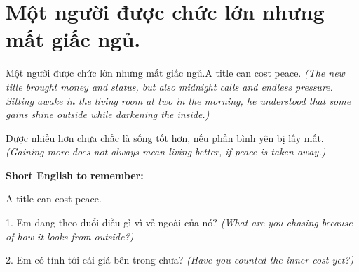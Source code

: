 \section{Một người được chức lớn nhưng mất giấc ngủ.}
\begin{truyen}{Một người được chức lớn nhưng mất giấc ngủ.}{A title can cost peace.}
\textit{(The new title brought money and status, but also midnight calls and endless pressure. Sitting awake in the living room at two in the morning, he understood that some gains shine outside while darkening the inside.)}
\end{truyen}
\begin{baihoc}
Được nhiều hơn chưa chắc là sống tốt hơn, nếu phần bình yên bị lấy mất.
\textit{(Gaining more does not always mean living better, if peace is taken away.)}
\end{baihoc}
\begin{ghinhoanh}\textbf{Short English to remember:}

A title can cost peace.
\end{ghinhoanh}
\begin{tuhocnhanh}
1. Em đang theo đuổi điều gì vì vẻ ngoài của nó? \textit{(What are you chasing because of how it looks from outside?)}

2. Em có tính tới cái giá bên trong chưa? \textit{(Have you counted the inner cost yet?)}
\end{tuhocnhanh}
\ngancach

